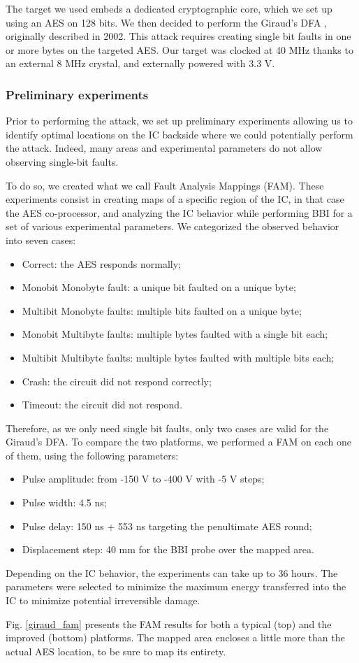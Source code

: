 		The target we used embeds a dedicated cryptographic core, which we set up using an AES on 128 bits.
		We then decided to perform the Giraud's DFA \cite{giraudDfa}, originally described in 2002.
		This attack requires creating single bit faults in one or more bytes on the targeted AES.
		Our target was clocked at 40 MHz thanks to an external 8 MHz crystal, and externally powered with 3.3 V.

		\subsubsection{Preliminary experiments}
			Prior to performing the attack, we set up preliminary experiments allowing us to identify optimal locations on the IC backside where we could potentially perform the attack.
			Indeed, many areas and experimental parameters do not allow observing single-bit faults.
			
			To do so, we created what we call Fault Analysis Mappings (FAM).
			These experiments consist in creating maps of a specific region of the IC, in that case the AES co-processor, and analyzing the IC behavior while performing BBI for a set of various experimental parameters.
			We categorized the observed behavior into seven cases:
			\begin{itemize}
				\item Correct: the AES responds normally;
				\item Monobit Monobyte fault: a unique bit faulted on a unique byte;
				\item Multibit Monobyte faults: multiple bits faulted on a unique byte;
				\item Monobit Multibyte faults: multiple bytes faulted with a single bit each;
				\item Multibit Multibyte faults: multiple bytes faulted with multiple bits each;
				\item Crash: the circuit did not respond correctly;
				\item Timeout: the circuit did not respond.
			\end{itemize}
			Therefore, as we only need single bit faults, only two cases are valid for the Giraud's DFA.
			To compare the two platforms, we performed a FAM on each one of them, using the following parameters:
			\begin{itemize}
				\item Pulse amplitude: from -150 V to -400 V with -5 V steps;
				\item Pulse width: 4.5 ns;
				\item Pulse delay: 150 ns + 553 ns targeting the penultimate AES round;
				\item Displacement step: 40 mm for the BBI probe over the mapped area.
			\end{itemize}
			Depending on the IC behavior, the experiments can take up to 36 hours.
			The parameters were selected to minimize the maximum energy transferred into the IC to minimize potential irreversible damage.
			
			Fig. \ref{giraud_fam} presents the FAM results for both a typical (top) and the improved (bottom) platforms.
			The mapped area encloses a little more than the actual AES location, to be sure to map its entirety.

